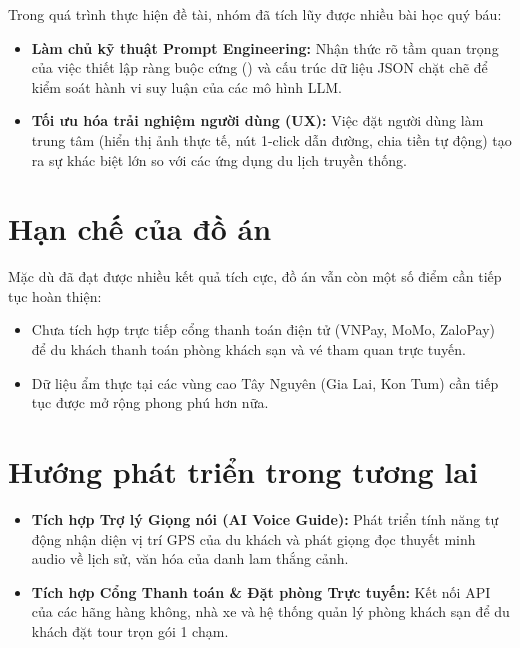 Trong quá trình thực hiện đề tài, nhóm đã tích lũy được nhiều bài học quý báu:
\begin{itemize}
    \item \textbf{Làm chủ kỹ thuật Prompt Engineering:} Nhận thức rõ tầm quan trọng của việc thiết lập ràng buộc cứng () và cấu trúc dữ liệu JSON chặt chẽ để kiểm soát hành vi suy luận của các mô hình LLM.
    \item \textbf{Tối ưu hóa trải nghiệm người dùng (UX):} Việc đặt người dùng làm trung tâm (hiển thị ảnh thực tế, nút 1-click dẫn đường, chia tiền tự động) tạo ra sự khác biệt lớn so với các ứng dụng du lịch truyền thống.
\end{itemize}

\section{Hạn chế của đồ án}

Mặc dù đã đạt được nhiều kết quả tích cực, đồ án vẫn còn một số điểm cần tiếp tục hoàn thiện:
\begin{itemize}
    \item Chưa tích hợp trực tiếp cổng thanh toán điện tử (VNPay, MoMo, ZaloPay) để du khách thanh toán phòng khách sạn và vé tham quan trực tuyến.
    \item Dữ liệu ẩm thực tại các vùng cao Tây Nguyên (Gia Lai, Kon Tum) cần tiếp tục được mở rộng phong phú hơn nữa.
\end{itemize}

\section{Hướng phát triển trong tương lai}

\begin{itemize}
    \item \textbf{Tích hợp Trợ lý Giọng nói (AI Voice Guide):} Phát triển tính năng tự động nhận diện vị trí GPS của du khách và phát giọng đọc thuyết minh audio về lịch sử, văn hóa của danh lam thắng cảnh.
    \item \textbf{Tích hợp Cổng Thanh toán \& Đặt phòng Trực tuyến:} Kết nối API của các hãng hàng không, nhà xe và hệ thống quản lý phòng khách sạn để du khách đặt tour trọn gói 1 chạm.
\end{itemize}
